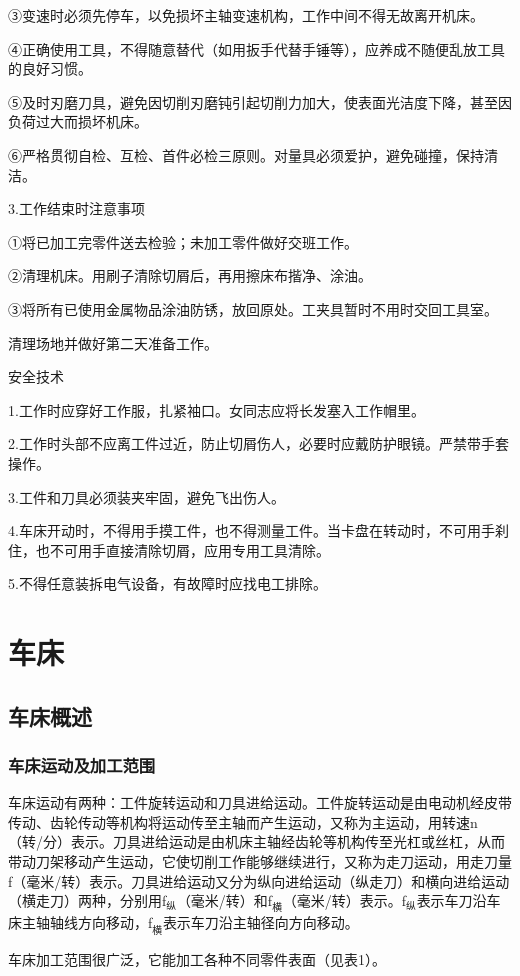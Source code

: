 \documentclass{ctexbook}
\begin{document}
③变速时必须先停车，以免损坏主轴变速机构，工作中间不得无故离开机床。

④正确使用工具，不得随意替代（如用扳手代替手锤等），应养成不随便乱放工具的良好习惯。

⑤及时刃磨刀具，避免因切削刃磨钝引起切削力加大，使表面光洁度下降，甚至因负荷过大而损坏机床。

⑥严格贯彻自检、互检、首件必检三原则。对量具必须爱护，避免碰撞，保持清洁。

3.工作结束时注意事项

①将已加工完零件送去检验；未加工零件做好交班工作。

②清理机床。用刷子清除切屑后，再用擦床布揩净、涂油。

③将所有已使用金属物品涂油防锈，放回原处。工夹具暂时不用时交回工具室。

清理场地并做好第二天准备工作。

安全技术

1.工作时应穿好工作服，扎紧袖口。女同志应将长发塞入工作帽里。

2.工作时头部不应离工件过近，防止切屑伤人，必要时应戴防护眼镜。严禁带手套操作。

3.工件和刀具必须装夹牢固，避免飞出伤人。

4.车床开动时，不得用手摸工件，也不得测量工件。当卡盘在转动时，不可用手刹住，也不可用手直接清除切屑，应用专用工具清除。

5.不得任意装拆电气设备，有故障时应找电工排除。
\section{车床}
\subsection{车床概述}
\subsubsection{车床运动及加工范围}
车床运动有两种：工件旋转运动和刀具进给运动。工件旋转运动是由电动机经皮带传动、齿轮传动等机构将运动传至主轴而产生运动，又称为主运动，用转速n（转/分）表示。刀具进给运动是由机床主轴经齿轮等机构传至光杠或丝杠，从而带动刀架移动产生运动，它使切削工作能够继续进行，又称为走刀运动，用走刀量f（毫米/转）表示。刀具进给运动又分为纵向进给运动（纵走刀）和横向进给运动（横走刀）两种，分别用f$_{\text{纵}}$（毫米/转）和f$_{\text{横}}$（毫米/转）表示。f$_{\text{纵}}$表示车刀沿车床主轴轴线方向移动，f$_{\text{横}}$表示车刀沿主轴径向方向移动。

车床加工范围很广泛，它能加工各种不同零件表面（见表1）。
\end{document}
